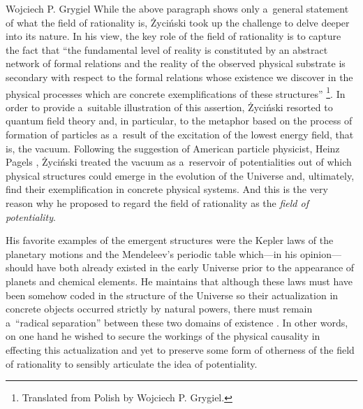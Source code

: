 \begin{artengenv}{Wojciech P. Grygiel}
While the above paragraph shows only a~general statement of what the field of rationality is, Życiński took up the challenge to delve deeper into its nature. In his view, the key role of the field of rationality is to capture the fact that ``the fundamental level of reality is constituted by an abstract network of formal relations and the reality of the observed physical substrate is secondary with respect to the formal relations whose existence we discover in the physical processes which are concrete exemplifications of these structures'' 
\parencite[][p.102]{zycinski_status_1995}%
\footnote{Translated from Polish by Wojciech P. Grygiel.}. In order to provide a~suitable illustration of this assertion, Życiński resorted to quantum field theory and, in particular, to the metaphor based on the process of formation of particles as a~result of the excitation of the lowest energy field, that is, the vacuum. Following the suggestion of American particle physicist, Heinz Pagels 
\parencite*[][p.245]{pagels_cosmic_1983}, %
 Życiński treated the vacuum as a~reservoir of potentialities out of which physical structures could emerge in the evolution of the Universe and, ultimately, find their exemplification in concrete physical systems. And this is the very reason why he proposed to regard the field of rationality as the \textit{field of potentiality}.



His favorite examples of the emergent structures were the Kepler laws of the planetary motions and the Mendeleev's periodic table which---in his opinion---should have both already existed in the early Universe prior to the appearance of planets and chemical elements. He maintains that although these laws must have been somehow coded in the structure of the Universe so their actualization in concrete objects occurred strictly by natural powers, there must remain a~``radical separation'' between these two domains of existence 
\parencite[][pp.53–54]{zycinski_pole_2006}. %
 In other words, on one hand he wished to secure the workings of the physical causality in effecting this actualization and yet to preserve some form of otherness of the field of rationality to sensibly articulate the idea of potentiality.




\end{artengenv}
